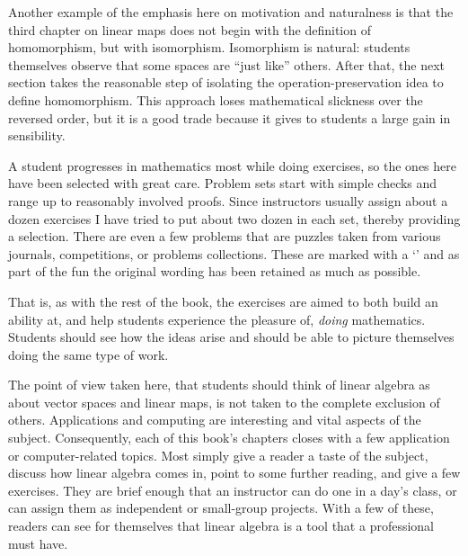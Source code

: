 Another example of the emphasis here on motivation and naturalness
is that the third chapter on linear maps
does not begin with the definition of homomorphism, 
but with isomorphism.
Isomorphism is natural: students themselves
observe that some spaces are ``just like'' others.
After that,
the next section takes the reasonable step of 
isolating the operation-preservation idea
to define homomorphism.
This approach loses mathematical slickness over the reversed order, 
but it is a good trade because it gives to students
a large gain in sensibility.


A student progresses in mathematics most while doing exercises, so the ones
here have been selected with great care.
Problem sets start with 
simple checks and range up to reasonably involved proofs.
Since instructors usually assign about a dozen exercises
I have tried to put about two dozen in each set, 
thereby providing a selection.
There are even a few problems that are puzzles
taken from various journals, competitions, or
problems collections. 
These are marked with a
`\puzzlemark' and 
as part of the fun the original wording
has been retained as much as possible.

That is, as with the rest of the book, 
the exercises are aimed to both build an ability at,
and help students experience the pleasure of, 
\emph{doing} mathematics.
Students should see how the ideas arise and should be able to 
picture themselves doing the same type of work.


\medskip
{}
The point of view taken here, that students should think of 
linear algebra as about vector spaces
and linear maps, is not taken to the complete exclusion of others.
Applications and computing are interesting and vital aspects 
of the subject.
Consequently, each of this book's chapters closes with a few 
application or computer-related topics.
Most simply give a reader
a taste of the subject, discuss how linear algebra comes in,
point to some further reading, and give a few exercises. 
They are brief enough that an instructor can do one
in a day's class, 
or can assign them as independent or small-group projects.
With a few of these, 
readers can see for themselves that linear algebra is a tool
that a professional must have. 




